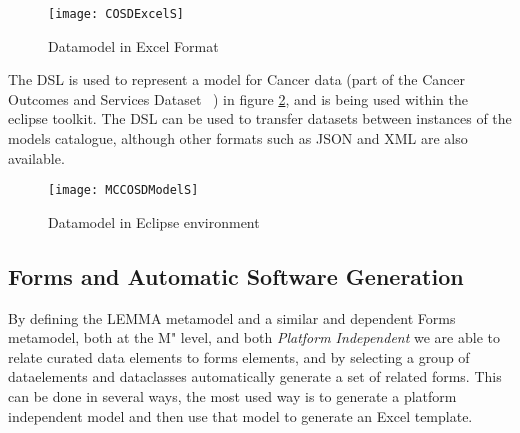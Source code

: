 \begin{figure}[here]
	\texttt{[image: COSDExcelS]}
	\caption{ Datamodel in Excel Format} 
	\label{fig:excelCOSD}
\end{figure}
The DSL is used to represent a model for Cancer data (part of the Cancer Outcomes and Services Dataset ~\cite{COSD}) in figure \ref{fig:elmcosd}, and is being used within the eclipse toolkit. The DSL can be used to transfer datasets between instances of the models catalogue, although other formats such as JSON and XML are also available.

\begin{figure}[here]
	\texttt{[image: MCCOSDModelS]}
	\caption{ Datamodel in Eclipse environment} 
	\label{fig:elmcosd}
\end{figure}

\subsection{Forms and Automatic Software Generation}

By defining the LEMMA metamodel and a similar and dependent Forms metamodel, both at the M" level, and both \emph{Platform Independent} we are able to relate curated data elements to forms elements, and by selecting a group of dataelements and dataclasses automatically generate a set of related forms. This can be done in several ways, the most used way is to generate a platform independent model and then use that model to generate an Excel template. 

